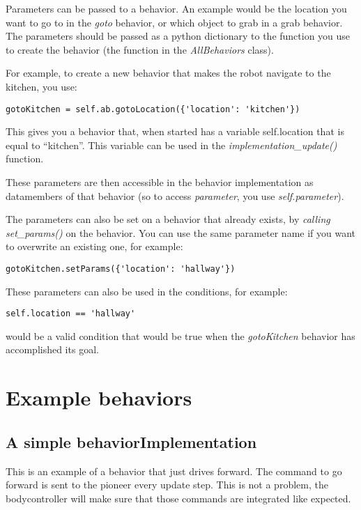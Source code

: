 \documentclass[a4paper, 10pt, oneside]{article}
\newcommand{\cod}[1]{\emph{#1}}
\begin{document}
Parameters can be passed to a behavior. An example would be the location you want to go to in the
\cod{goto} behavior, or which object to grab in a grab behavior. The parameters should be passed as
a python dictionary to the function you use to create the behavior (the function in the
\cod{AllBehaviors}
class).

For example, to create a new behavior that makes the robot navigate to the kitchen, you use:

\begin{verbatim}
gotoKitchen = self.ab.gotoLocation({'location': 'kitchen'})
\end{verbatim}

This gives you a behavior that, when started has a variable self.location that is equal to
``kitchen''. This variable can be used in the \cod{implementation\_update()} function.

These parameters are then accessible in the behavior implementation as datamembers of that behavior
(so to access \cod{parameter}, you use \cod{self.parameter}).

The parameters can also be set on a behavior that already exists, by \cod{calling set\_params()} on
the behavior. You can use the same parameter name if you want to overwrite an existing one, for
example:

\begin{verbatim}
gotoKitchen.setParams({'location': 'hallway'})
\end{verbatim}

These parameters can also be used in the conditions, for example:
\begin{verbatim}
self.location == 'hallway'
\end{verbatim}
would be a valid condition that would be true when the \cod{gotoKitchen} behavior has accomplished
its goal.


\appendix
\section{Example behaviors}

\subsection{A simple behaviorImplementation}

This is an example of a behavior that just drives forward. The command to go forward is sent to the pioneer every
update step. This is not a problem, the bodycontroller will make sure that those commands are integrated like expected.
\end{document}
